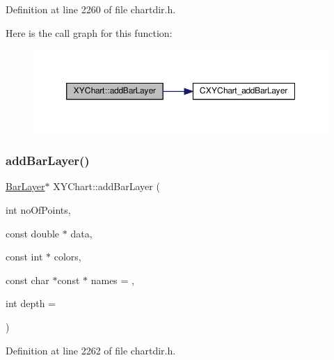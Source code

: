 Definition at line 2260 of file chartdir.\+h.

Here is the call graph for this function\+:
\nopagebreak
\begin{figure}[H]
\begin{center}
\leavevmode
\includegraphics[width=350pt]{class_x_y_chart_ae821562406a385684737ab013a72ffa6_cgraph}
\end{center}
\end{figure}
\mbox{\label{class_x_y_chart_a4e8e1491c3e847fab0f69d8296c84a5c}} 
\subsubsection{\texorpdfstring{add\+Bar\+Layer()}{addBarLayer()}\hspace{0.1cm}{\footnotesize\ttfamily [3/5]}}
{\footnotesize\ttfamily \hyperlink{class_bar_layer}{Bar\+Layer}$\ast$ X\+Y\+Chart\+::add\+Bar\+Layer (\begin{DoxyParamCaption}\item[{int}]{no\+Of\+Points,  }\item[{const double $\ast$}]{data,  }\item[{const int $\ast$}]{colors,  }\item[{const char $\ast$const $\ast$}]{names = {},  }\item[{int}]{depth = {} }\end{DoxyParamCaption})\hspace{0.3cm}{\ttfamily [inline]}}



Definition at line 2262 of file chartdir.\+h.

\mbox{\label{class_x_y_chart_a80c3492d60a99e04c11592ed3a0f0b0c}} 
